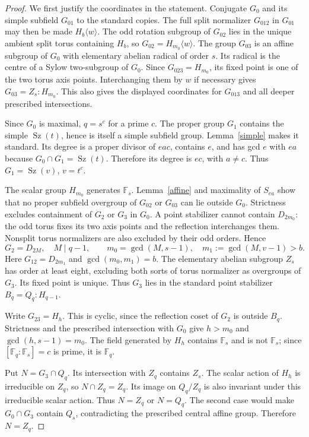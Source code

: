 \documentclass[11pt,a4paper]{article}
\newcommand{\Sz}{\operatorname{Sz}}\newcommand{\F}{\mathbb F}
\begin{document}
\begin{proof}
We first justify the coordinates in the statement. Conjugate $G_0$
and its simple subfield $G_{01}$ to the standard copies. The full
split normalizer $G_{012}$ in $G_{01}$ may then be made
$H_b\langle w\rangle$. The odd rotation subgroup of $G_{02}$ lies
in the unique ambient split torus containing $H_b$, so
$G_{02}=H_{m_0}\langle w\rangle$. The group $G_{03}$ is an affine
subgroup of $G_0$ with elementary abelian radical of order $s$.
Its radical is the centre of a Sylow two-subgroup of $G_0$.
Since $G_{023}=H_{m_0}$, its fixed point is one of the two torus axis
points. Interchanging them by $w$ if necessary gives
$G_{03}=Z_s:H_{m_0}$. This also gives the displayed coordinates
for $G_{013}$ and all deeper prescribed intersections.

Since $G_0$ is maximal, $q=s^c$ for a prime $c$. The proper group
$G_1$ contains the simple $\Sz(t)$, hence is itself a simple subfield
group. Lemma~\ref{simple} makes it standard. Its degree is a proper
divisor of $eac$, contains $e$, and has gcd $e$ with $ea$ because
$G_0\cap G_1=\Sz(t)$. Therefore its degree is $ec$, with $a\ne c$.
Thus $G_1=\Sz(v)$, $v=t^c$.

The scalar group $H_{m_0}$ generates $\F_s$. Lemma~\ref{affine}
and maximality of $S_{ea}$ show that no proper subfield overgroup
of $G_{02}$ or $G_{03}$ can lie outside $G_0$. Strictness excludes
containment of $G_2$ or $G_3$ in $G_0$. A point stabilizer cannot
contain $D_{2m_0}$: the odd torus fixes its two axis points and the
reflection interchanges them. Nonsplit torus normalizers are also
excluded by their odd orders. Hence
\[
 G_2=D_{2M},\quad M\mid q-1,\qquad
 m_0=\gcd(M,s-1),\quad m_1:=\gcd(M,v-1)>b.
\]
Here $G_{12}=D_{2m_1}$ and $\gcd(m_0,m_1)=b$.
The elementary abelian subgroup $Z_s$ has order at least eight,
excluding both sorts of torus normalizer as overgroups of $G_3$.
Its fixed point is unique. Thus $G_3$ lies in the standard point
stabilizer $B_q=Q_q:H_{q-1}$.

Write $G_{23}=H_h$. This is cyclic, since the reflection coset of
$G_2$ is outside $B_q$. Strictness and the prescribed intersection
with $G_0$ give $h>m_0$ and $\gcd(h,s-1)=m_0$. The field generated
by $H_h$ contains $\F_s$ and is not $\F_s$; since $[\F_q:\F_s]=c$
is prime, it is $\F_q$.

Put $N=G_3\cap Q_q$. Its intersection with $Z_q$ contains $Z_s$.
The scalar action of $H_h$ is irreducible on $Z_q$, so
$N\cap Z_q=Z_q$. Its image on $Q_q/Z_q$ is also invariant under
this irreducible scalar action. Thus $N=Z_q$ or $N=Q_q$.
The second case would make $G_0\cap G_3$ contain $Q_s$, contradicting
the prescribed central affine group. Therefore $N=Z_q$.


\end{proof}
\end{document}
